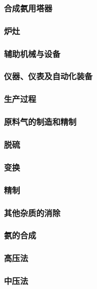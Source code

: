 \documentclass[UTF8]{../../ApplicationUniverse}
\begin{document}
            \subsubsection{合成氨用塔器}
            \subsubsection{炉灶}
            \subsubsection{辅助机械与设备}
            \subsubsection{仪器、仪表及自动化装备}
        \subsubsection{生产过程}
            \subsubsection{原料气的制造和精制}
                \subsubsection{脱硫}
                \subsubsection{变换}
                \subsubsection{精制}
                \subsubsection{其他杂质的消除}
            \subsubsection{氨的合成}
                \subsubsection{高压法}
                \subsubsection{中压法}
\end{document}
